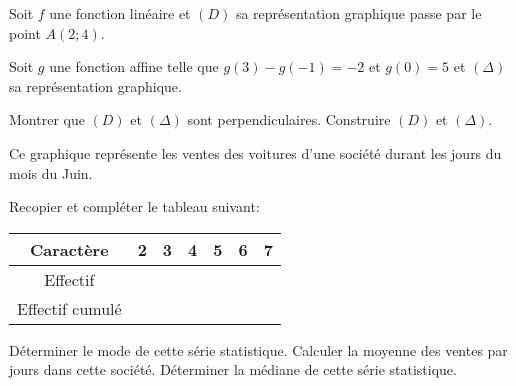 \documentclass[a4paper,addpoints,12pt]{exam}
\begin{document}
\devoir[sem=2,prv=false,ds=false,num=6 ,niv=3 ,date=12/05/2023,Rdate=23/05/2023]

\begin{exo}
\begin{questions}
\question Soit $f$ une fonction linéaire et $(D)$ sa représentation graphique passe par le point $A(2;4)$.
\question Soit $g$ une fonction affine telle que $g(3)-g(-1)=-2$ et $g(0)=5$ et $(\Delta)$ sa représentation graphique.
\question Montrer que $(D)$ et $(\Delta)$ sont perpendiculaires.
\question Construire  $(D)$ et $(\Delta)$.
\end{questions}
\end{exo}

\begin{exo}

Ce graphique représente les ventes des voitures d'une société durant les jours du mois du Juin.
\begin{questions}
\question Recopier et compléter le tableau suivant:
\begin{EnvFullwidth}
\begin{tabular}{|c|c|c|c|c|c|c|}
\hline 
Caractère & 2 & 3 & 4 & 5 & 6 & 7 \\ 
\hline 
Effectif &  &  &  &  &  &  \\ 
\hline 
Effectif cumulé  &  &  &  &  &  &  \\ 
\hline 
\end{tabular}
\end{EnvFullwidth}
\question Déterminer le mode de cette série statistique.
\question Calculer la moyenne des ventes par jours dans cette société.
\question Déterminer la médiane de cette série statistique. 
\end{questions}
\end{exo}
\end{document}
